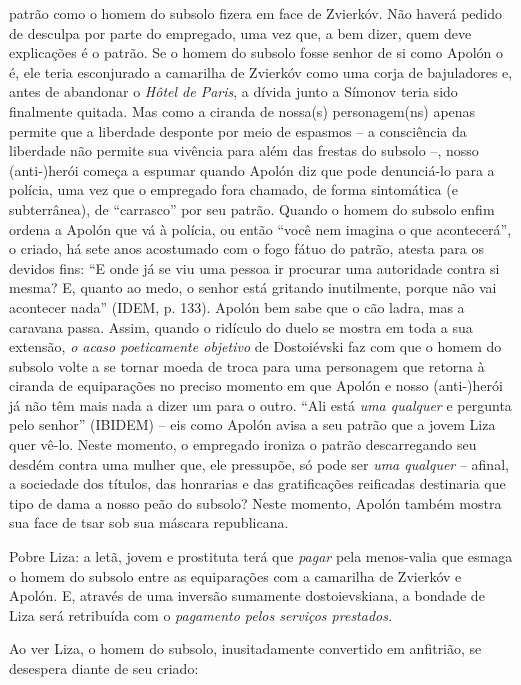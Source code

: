 patrão como o homem do subsolo fizera em face de Zvierkóv. Não haverá
pedido de desculpa por parte do empregado, uma vez que, a bem dizer,
quem deve explicações é o patrão. Se o homem do subsolo fosse senhor de
si como Apolón o é, ele teria esconjurado a camarilha de Zvierkóv como
uma corja de bajuladores e, antes de abandonar o \emph{Hôtel de Paris},
a dívida junto a Símonov teria sido finalmente quitada. Mas como a
ciranda de nossa(s) personagem(ns) apenas permite que a liberdade
desponte por meio de espasmos -- a consciência da liberdade não permite
sua vivência para além das frestas do subsolo --, nosso (anti-)herói
começa a espumar quando Apolón diz que pode denunciá-lo para a polícia,
uma vez que o empregado fora chamado, de forma sintomática (e
subterrânea), de ``carrasco'' por seu patrão. Quando o homem do subsolo
enfim ordena a Apolón que vá à polícia, ou então ``você nem imagina o
que acontecerá'', o criado, há sete anos acostumado com o fogo fátuo do
patrão, atesta para os devidos fins: ``E onde já se viu uma pessoa ir
procurar uma autoridade contra si mesma? E, quanto ao medo, o senhor
está gritando inutilmente, porque não vai acontecer nada'' (IDEM, p.
133). Apolón bem sabe que o cão ladra, mas a caravana passa. Assim,
quando o ridículo do duelo se mostra em toda a sua extensão, \emph{o
acaso poeticamente objetivo} de Dostoiévski faz com que o homem do
subsolo volte a se tornar moeda de troca para uma personagem que retorna
à ciranda de equiparações no preciso momento em que Apolón e nosso
(anti-)herói já não têm mais nada a dizer um para o outro. ``Ali está
\emph{uma qualquer} e pergunta pelo senhor'' (IBIDEM) -- eis como Apolón
avisa a seu patrão que a jovem Liza quer vê-lo. Neste momento, o
empregado ironiza o patrão descarregando seu desdém contra uma mulher
que, ele pressupõe, só pode ser \emph{uma qualquer} -- afinal, a
sociedade dos títulos, das honrarias e das gratificações reificadas
destinaria que tipo de dama a nosso peão do subsolo? Neste momento,
Apolón também mostra sua face de tsar sob sua máscara republicana.

Pobre Liza: a letã, jovem e prostituta terá que \emph{pagar} pela
menos-valia que esmaga o homem do subsolo entre as equiparações com a
camarilha de Zvierkóv e Apolón. E, através de uma inversão sumamente
dostoievskiana, a bondade de Liza será retribuída com o \emph{pagamento
pelos serviços prestados. }

Ao ver Liza, o homem do subsolo, inusitadamente convertido em anfitrião,
se desespera diante de seu criado:

